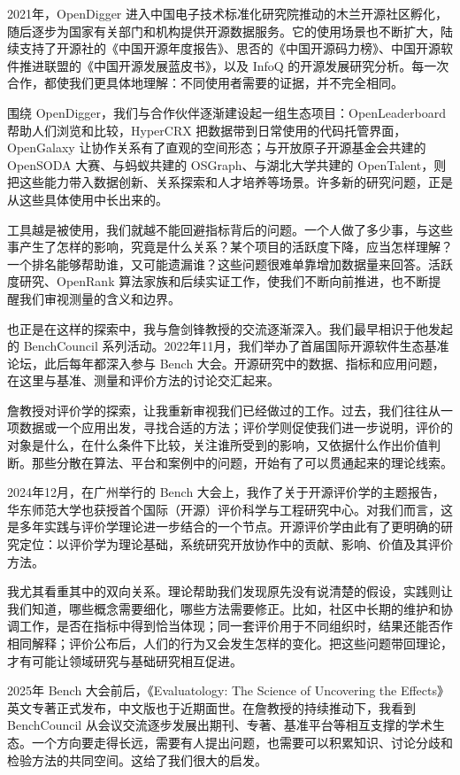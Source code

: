 2021年，OpenDigger 进入中国电子技术标准化研究院推动的木兰开源社区孵化，随后逐步为国家有关部门和机构提供开源数据服务。它的使用场景也不断扩大，陆续支持了开源社的《中国开源年度报告》、思否的《中国开源码力榜》、中国开源软件推进联盟的《中国开源发展蓝皮书》，以及 InfoQ 的开源发展研究分析。每一次合作，都使我们更具体地理解：不同使用者需要的证据，并不完全相同。

围绕 OpenDigger，我们与合作伙伴逐渐建设起一组生态项目：OpenLeaderboard 帮助人们浏览和比较，HyperCRX 把数据带到日常使用的代码托管界面，OpenGalaxy 让协作关系有了直观的空间形态；与开放原子开源基金会共建的 OpenSODA 大赛、与蚂蚁共建的 OSGraph、与湖北大学共建的 OpenTalent，则把这些能力带入数据创新、关系探索和人才培养等场景。许多新的研究问题，正是从这些具体使用中长出来的。

工具越是被使用，我们就越不能回避指标背后的问题。一个人做了多少事，与这些事产生了怎样的影响，究竟是什么关系？某个项目的活跃度下降，应当怎样理解？一个排名能够帮助谁，又可能遗漏谁？这些问题很难单靠增加数据量来回答。活跃度研究、OpenRank 算法家族和后续实证工作，使我们不断向前推进，也不断提醒我们审视测量的含义和边界。

也正是在这样的探索中，我与詹剑锋教授的交流逐渐深入。我们最早相识于他发起的 BenchCouncil 系列活动。2022年11月，我们举办了首届国际开源软件生态基准论坛，此后每年都深入参与 Bench 大会。开源研究中的数据、指标和应用问题，在这里与基准、测量和评价方法的讨论交汇起来。

詹教授对评价学的探索，让我重新审视我们已经做过的工作。过去，我们往往从一项数据或一个应用出发，寻找合适的方法；评价学则促使我们进一步说明，评价的对象是什么，在什么条件下比较，关注谁所受到的影响，又依据什么作出价值判断。那些分散在算法、平台和案例中的问题，开始有了可以贯通起来的理论线索。

2024年12月，在广州举行的 Bench 大会上，我作了关于开源评价学的主题报告，华东师范大学也获授首个国际（开源）评价科学与工程研究中心。对我们而言，这是多年实践与评价学理论进一步结合的一个节点。开源评价学由此有了更明确的研究定位：以评价学为理论基础，系统研究开放协作中的贡献、影响、价值及其评价方法。

我尤其看重其中的双向关系。理论帮助我们发现原先没有说清楚的假设，实践则让我们知道，哪些概念需要细化，哪些方法需要修正。比如，社区中长期的维护和协调工作，是否在指标中得到恰当体现；同一套评价用于不同组织时，结果还能否作相同解释；评价公布后，人们的行为又会发生怎样的变化。把这些问题带回理论，才有可能让领域研究与基础研究相互促进。

2025年 Bench 大会前后，《Evaluatology: The Science of Uncovering the Effects》英文专著正式发布，中文版也于近期面世。在詹教授的持续推动下，我看到 BenchCouncil 从会议交流逐步发展出期刊、专著、基准平台等相互支撑的学术生态。一个方向要走得长远，需要有人提出问题，也需要可以积累知识、讨论分歧和检验方法的共同空间。这给了我们很大的启发。

